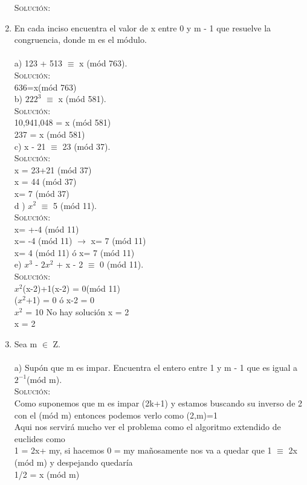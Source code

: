 \documentclass[letterpaper,10pt]{article}
\begin{document}
\begin{enumerate}
    \textsc{Solución:}
	\\
    \item En cada inciso encuentra el valor de x entre 0 y m - 1 que resuelve la congruencia, donde m es el módulo.
     \\ \\
    a) 123 + 513 $\equiv$ x (mód 763).\\     
    \textsc{Solución:}
	\\    
	636=x(mód 763)\\
   	b) $222^{3}$ $\equiv$ x (mód 581).\\     
    \textsc{Solución:}
	\\
	10,941,048 = x (mód 581) \\
	237 = x (mód 581)   \\
	
	c) x - 21 $\equiv$ 23 (mód 37).\\     
    \textsc{Solución:}
	\\
	x = 23+21 (mód 37)\\
	x = 44 (mód 37)\\
	x= 7 (mód 37)   \\
	
	d ) $x^{2}$ $\equiv$ 5 (mód 11).\\     
    \textsc{Solución:}
	\\   
	x= +-4 (mód 11)\\
	x= -4 (mód 11) $\rightarrow$ x= 7 (mód 11)\\
	x= 4 (mód 11) ó x= 7 (mód 11)\\
	
	e) $x^{3}$ - $2x^{2}$ + x - 2 $\equiv$ 0 (mód 11).\\     
    \textsc{Solución:}
	\\  
	$x^{2}$(x-2)+1(x-2) = 0(mód 11)\\
	($x^{2}$+1) = 0		ó	x-2 = 0\\
	$x^{2}$ = 10 No hay solución	x = 2\\
	x = 2
	 
    \item Sea m $\in$ Z.
     \\ \\
     a) Supón que m es impar. Encuentra el entero entre 1 y m - 1 que es igual
a $2^{-1} $(mód m).\\         
    \textsc{Solución:}
	\\
	Como suponemos que m es impar (2k+1) y estamos buscando su inverso de 2
con el (mód m) entonces podemos verlo como (2,m)=1
\\Aqui nos servirá mucho ver el problema como el algoritmo extendido de euclides como\\ 1 = 2x+ my, si hacemos 0 = my mañosamente nos va a quedar 
que 1 $\equiv$ 2x (mód m) y despejando quedaría\\ 1/2 = x (mód m)
	

\end{enumerate}
\end{document}
